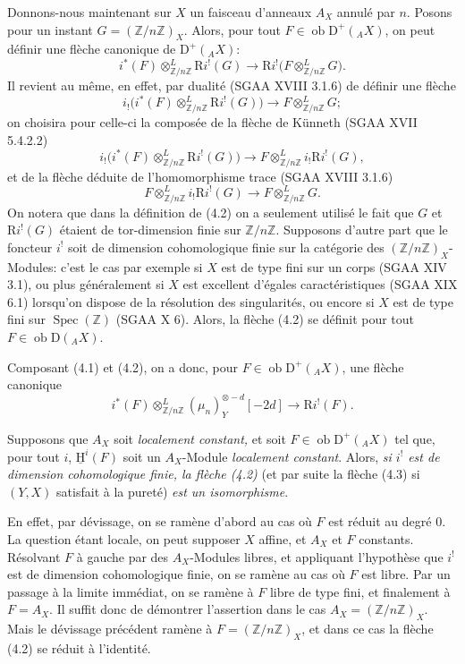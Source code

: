 \documentclass[11pt]{article}
\providecommand{\uH}{\underline{\mathrm H}}
\DeclareMathOperator{\Spec}{Spec}
\newcommand{\R}{\mathrm{R}}\newcommand{\RHomCore}{\mathrm{RHom}}
\newcommand{\D}{\mathrm{D}}
\newcommand{\Z}{\mathbb{Z}}
\newcommand{\ob}{\operatorname{ob}}
\providecommand{\ob}{\operatorname{ob}}
\providecommand{\R}{\mathrm R}
\providecommand{\Z}{\mathbb Z}
\providecommand{\Spec}{\operatorname{Spec}}
\providecommand{\Spec}{\operatorname{Spec}}
\providecommand{\Spec}{\operatorname{Spec}}
\providecommand{\Spec}{\operatorname{Spec}}
\begin{document}
Donnons-nous maintenant sur $X$ un faisceau d'anneaux $A_X$ annulé par $n$. Posons pour un instant $G=(\Z/n\Z)_X$. Alors, pour tout $F\in\ob\D^+({}_A X)$, on peut définir une flèche canonique de $\D^+({}_A X)$:
\begin{equation}\tag{4.2}
        i^*(F)\otimes^L_{\Z/n\Z} \R i^!(G)\longrightarrow \R i^!\bigl(F\otimes^L_{\Z/n\Z}G\bigr).
\end{equation}
Il revient au même, en effet, par dualité (SGAA XVIII 3.1.6) de définir une flèche
\[
        i_!\bigl(i^*(F)\otimes^L_{\Z/n\Z}\R i^!(G)\bigr)\longrightarrow F\otimes^L_{\Z/n\Z}G;
\]
on choisira pour celle-ci la composée de la flèche de Künneth (SGAA XVII 5.4.2.2)
\[
        i_!\bigl(i^*(F)\otimes^L_{\Z/n\Z}\R i^!(G)\bigr)\longrightarrow F\otimes^L_{\Z/n\Z}i_!\R i^!(G),
\]
et de la flèche déduite de l'homomorphisme trace (SGAA XVIII 3.1.6)
\[
        F\otimes^L_{\Z/n\Z}i_!\R i^!(G)\longrightarrow F\otimes^L_{\Z/n\Z}G.
\]
On notera que dans la définition de (4.2) on a seulement utilisé le fait que $G$ et $\R i^!(G)$ étaient de tor-dimension finie sur $\Z/n\Z$. Supposons d'autre part que le foncteur $i^!$ soit de dimension cohomologique finie sur la catégorie des $(\Z/n\Z)_X$-Modules: c'est le cas par exemple si $X$ est de type fini sur un corps (SGAA XIV 3.1), ou plus généralement si $X$ est excellent d'égales caractéristiques (SGAA XIX 6.1) lorsqu'on dispose de la résolution des singularités, ou encore si $X$ est de type fini sur $\Spec(\Z)$ (SGAA X 6). Alors, la flèche (4.2) se définit pour tout $F\in\ob\D({}_A X)$.

Composant (4.1) et (4.2), on a donc, pour $F\in\ob\D^+({}_A X)$, une flèche canonique
\begin{equation}\tag{4.3}
        i^*(F)\otimes^L_{\Z/n\Z}(\mu_n)_Y^{\otimes -d}[-2d]\longrightarrow \R i^!(F).
\end{equation}

Supposons que $A_X$ soit \emph{localement constant,} et soit $F\in\ob\D^+({}_A X)$ tel que, pour tout $i$, $\uH^i(F)$ soit un $A_X$-Module \emph{localement constant}. Alors, \emph{si $i^!$ est de dimension cohomologique finie, la flèche (4.2)} (et par suite la flèche (4.3) si $(Y,X)$ satisfait à la pureté) \emph{est un isomorphisme}.

En effet, par dévissage, on se ramène d'abord au cas où $F$ est réduit au degré $0$. La question étant locale, on peut supposer $X$ affine, et $A_X$ et $F$ constants. Résolvant $F$ à gauche par des $A_X$-Modules libres, et appliquant l'hypothèse que $i^!$ est de dimension cohomologique finie, on se ramène au cas où $F$ est libre. Par un passage à la limite immédiat, on se ramène à $F$ libre de type fini, et finalement à $F=A_X$. Il suffit donc de démontrer l'assertion dans le cas $A_X=(\Z/n\Z)_X$. Mais le dévissage précédent ramène à $F=(\Z/n\Z)_X$, et dans ce cas la flèche (4.2) se réduit à l'identité.
\end{document}
